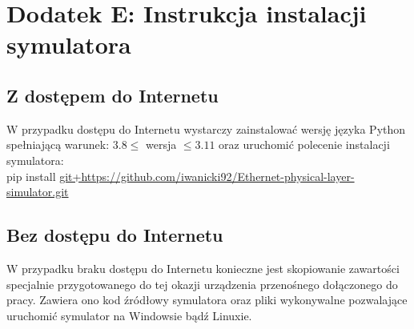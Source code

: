 \setcounter{secnumdepth}{0}
\section*{Dodatek E: Instrukcja instalacji symulatora}

\subsection{Z dostępem do Internetu}
W przypadku dostępu do Internetu wystarczy zainstalować wersję języka Python
spełniającą warunek: $3.8 \le$ wersja $\le 3.11$ oraz uruchomić polecenie
instalacji symulatora: \\ pip install \url{git+https://github.com/iwanicki92/Ethernet-physical-layer-simulator.git}

\subsection{Bez dostępu do Internetu}
W przypadku braku dostępu do Internetu konieczne jest skopiowanie zawartości specjalnie przygotowanego do tej okazji urządzenia przenośnego dołączonego do pracy.
Zawiera ono kod źródłowy symulatora oraz pliki wykonywalne pozwalające uruchomić
symulator na Windowsie bądź Linuxie.
